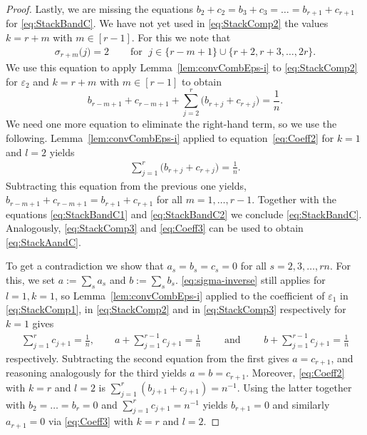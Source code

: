 \documentclass[10pt,a4paper]{article}
\numberwithin{equation}{section}
\newcommand{\eps}{\varepsilon}
\begin{document}
\begin{proof}
	
Lastly, we are missing the equations $b_2 + c_2 = b_3 + c_3 = \ldots = b_{r+1} + c_{r+1}$  for \cref{eq:StackBandC}. We have not yet used in \cref{eq:StackComp2} the values $k = r + m$ with $m \in [r-1]$. For this we note that
\begin{align*}
	\sigma_{r + m} \big(j \big) =  2 \quad &\text{ for } \; j \in  \{r - m + 1\} \cup \{r + 2, r + 3, \dots, 2 r\}.
	\end{align*}
We use this equation to apply Lemma~\ref{lem:convCombEps-i} to \eqref{eq:StackComp2} for $\eps_2$ and $k=r + m$ with $m \in [r-1]$ to obtain 
$$ b_{r - m + 1} + c_{r - m +1} + \sum_{j=2}^{r} \big( b_{r + j} + c_{r + j} \big) = \frac{1}{n}.
$$
We need one more equation to eliminate the right-hand term, so we use the following. Lemma~\ref{lem:convCombEps-i} applied to 
equation~\eqref{eq:Coeff2} for $k=1$ and $l=2$ yields
	\begin{align*}
	\sum_{j=1}^r \big( b_{r + j} + c_{r + j} \big) = \frac{1}{n}.
	\end{align*}
Subtracting this equation from the previous one yields, $b_{r - m + 1} + c_{r - m +1} = b_{r+1} + c_{r + 1}$ for all $m = 1,\ldots,r-1$. Together with the equations \eqref{eq:StackBandC1} and \eqref{eq:StackBandC2} we conclude \cref{eq:StackBandC}. Analogously, \eqref{eq:StackComp3} and \eqref{eq:Coeff3} can be used to obtain
	\cref{eq:StackAandC}. 

To get a contradiction we show that $a_s = b_s = c_s = 0$ for all $s = 2,3,\ldots, r n$. For this, we set $a := \sum_{s} a_s$ and $b := \sum_s b_s$. \cref{eq:sigma-inverse} still applies for $l =1, k = 1$, so Lemma~\ref{lem:convCombEps-i} applied to the coefficient of $\eps_1$ in \eqref{eq:StackComp1}, in \eqref{eq:StackComp2} and in \eqref{eq:StackComp3} respectively for $k=1$ gives
	\begin{align*}
	\sum_{j=1}^{r} c_{j+1} = \frac{1}{n}, \qquad a + \sum_{j=1}^{r-1} c_{j+1} = \frac{1}{n} \qquad \text{ and } \qquad
	b + \sum_{j=1}^{r-1} c_{j+1} = \frac{1}{n}
	\end{align*}
respectively. Subtracting the second equation from the first gives $a=c_{r+1}$, and reasoning analogously for the third yields $a=b=c_{r+1}$. Moreover, \eqref{eq:Coeff2} with $k=r$ and $l=2$ is $\sum_{j=1}^r (b_{j+1} + c_{j+1}) = n^{-1}$. Using the latter together with $b_2 = \ldots = b_r = 0$ and $\sum_{j=1}^{r} c_{j+1} = n^{-1}$ yields $b_{r+1} = 0$ and similarly $a_{r+1} = 0$ via \eqref{eq:Coeff3} with $k=r$ and $l=2$.


\end{proof}
\end{document}

